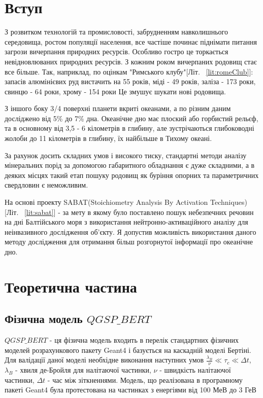 \documentclass[a4paper, 14pt]{article}
\numberwithin{equation}{section}
\numberwithin{table}{section}
\begin{document}
\section{Вступ}

З розвитком технологій та промисловості, забрудненням навколишнього середовища, ростом популяції населення, все частіше починає піднімати питання загрози вичерпання природних ресурсів. Особливо гостро це торкається невідновлюваних природних ресурсів. З кожним роком вичерпаних родовищ стає все більше. Так, наприклад, по оцінкам "Римського клубу"[Літ. ~\ref{lit:romeClub}]: запасів алюмінієвих руд вистачить на 55 років, міді - 49 років, заліза - 173 роки, свинцю - 64 роки, хрому - 154 роки Це змушує шукати нові родовища.

З іншого боку 3/4 поверхні планети вкриті океанами, а по різним даним досліджено від 5\% до 7\% дна.
Океанічне дно має плоский або горбистий рельєф, та в основному від 3,5 - 6 кілометрів в глибину, але зустрічаються глибоководні жолоби до 11 кілометрів в глибину, їх найбільше в Тихому океані. 

За рахунок досить складних умов і високого тиску, стандартні методи аналізу мінеральних порід за допомогою габаритного обладнання є дуже складними, а в деяких місцях такий етап пошуку родовищ як буріння опорних та параметричних свердловин є неможливим.

На основі проекту SABAT(Stoichiometry Analysis By Activation Techniques)[Літ. ~\ref{lit:sabat}] - за мету в якому було поставлено пошук небезпечних речовин на дні Балтійського моря з використання нейтронно-активаційного аналізу для неінвазивного дослідження об'єкту. Я допустив можливість використання даного методу дослідження для отримання більш розгорнутої інформації про океанічне дно.		

\newpage
\section{Теоретична частина}
\setcounter{figure}{0} 
\subsection{Фізична модель $QGSP\_BERT$}
$QGSP\_BERT$ - ця фізична модель входить в перелік стандартних фізичних моделей розрахункового пакету Geant4 і базується на каскадній моделі Бертіні. Для валідації даної моделі необхідне виконання наступних умов $\frac{\lambda_B}{\nu} \ll \tau_c \ll \Delta{t}$, $\lambda_B$ - хвиля де-Бройля для налітаючої частинки, $\nu$ - швидкість налітаючої частинки, $\Delta{t}$ - час між зіткненнями. 
Модель, що реалізована в програмному пакеті Geant4 була протестована на частинках з енергіями від 100 МеВ до 3 ГеВ
\end{document}
